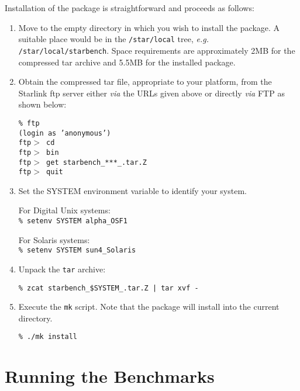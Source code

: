 Installation of the package is straightforward and proceeds as follows:

\begin{enumerate}
\item Move to the empty directory in which you wish to install the package.
A suitable place would be in the {\tt /star/local} tree, {\em e.g.} 
{\tt /star/local/starbench}. Space requirements are approximately 2MB for
the compressed tar archive and 5.5MB for the installed package.

\item Obtain the compressed tar file, appropriate to your platform, from the Starlink ftp server either {\em via} the URLs given above or directly {\em via} FTP as shown below:

{\tt    \% ftp \pkgftpsrv            \\
        (login as 'anonymous')                 \\
        ftp$>$ cd \pkgftpdir                   \\
        ftp$>$ bin                             \\
        ftp$>$ get starbench\_***\_\pkgver.tar.Z   \\
        ftp$>$ quit }

\item Set the SYSTEM environment variable to identify your system. 

For Digital Unix systems: \\
{\tt \% setenv SYSTEM alpha\_OSF1}

For Solaris systems: \\
{\tt \% setenv SYSTEM sun4\_Solaris}

\item Unpack the {\tt tar} archive:

{\tt \% zcat starbench\_\$SYSTEM\_\pkgver.tar.Z | tar xvf - }

\item Execute the {\tt mk} script. Note that the package will install into the
current directory.

{\tt \% ./mk install}
\end{enumerate}


\section{Running the Benchmarks}


